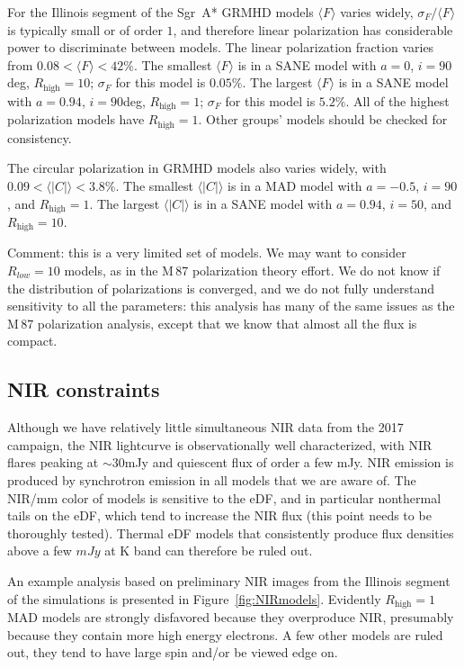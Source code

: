 \documentclass[twocolumn,tighten,dvipsnames]{aastex63}
\newcommand\sgra{Sgr~A*\xspace}
\def\M87{M\,87\xspace}
\newcommand\Rh{R_\mathrm{high}}
\newcommand\<{{\langle}}
\renewcommand\>{{\rangle}} %
\begin{document}
For the Illinois segment of the \sgra GRMHD models $\< F\>$ varies widely, $\sigma_F/\<F\>$ is typically small or of order $1$, and therefore linear polarization has considerable power to discriminate between models.  The linear polarization fraction varies from $0.08 < \<F\> < 42 \%$.  The smallest $\<F\>$ is in a SANE model with $a = 0$, $i = 90$deg, $\Rh = 10$; $\sigma_F$ for this model is $0.05\%$. The largest $\<F\>$ is in a SANE model with $a = 0.94$, $i = 90$deg, $\Rh = 1$; $\sigma_F$ for this model is $5.2\%$.  All of the highest polarization models have $\Rh = 1$.  Other groups' models should be checked for consistency.

The circular polarization in GRMHD models also varies widely, with  $0.09 < \<|C|\> < 3.8 \%$.  The smallest $\<|C|\>$ is in a MAD model with $a = -0.5$, $i = 90$, and $\Rh = 1$.  The largest $\<|C|\>$ is in a SANE model with $a = 0.94$, $i = 50$, and $\Rh = 10$.

Comment: this is a very limited set of models.  We may want to consider $R_{low} = 10$ models, as in the \M87 polarization theory effort.   We do not know if the distribution of polarizations is converged, and we do not fully understand sensitivity to all the parameters: this analysis has many of the same issues as the \M87 polarization analysis, except that we know that almost all the flux is compact.

\subsection{NIR constraints}
\label{sec:nirconst}

Although we have relatively little simultaneous NIR data from the 2017 campaign, the NIR lightcurve is observationally well characterized, with NIR flares peaking at $\sim 30$mJy and quiescent flux of order a few mJy.  NIR emission is produced by synchrotron emission in all models that we are aware of.  The NIR/mm color of models is sensitive to the eDF, and in particular nonthermal tails on the eDF, which tend to increase the NIR flux (this point needs to be thoroughly tested).  Thermal eDF models that consistently produce flux densities above a few $mJy$ at K band can therefore be ruled out.

An example analysis based on preliminary NIR images from the Illinois segment of the simulations is presented in Figure~\ref{fig:NIRmodels}.  Evidently $\Rh = 1$ MAD models are strongly disfavored because they overproduce NIR, presumably because they contain more high energy electrons.  A few other models are ruled out, they tend to have large spin and/or be viewed edge on.
\end{document}
